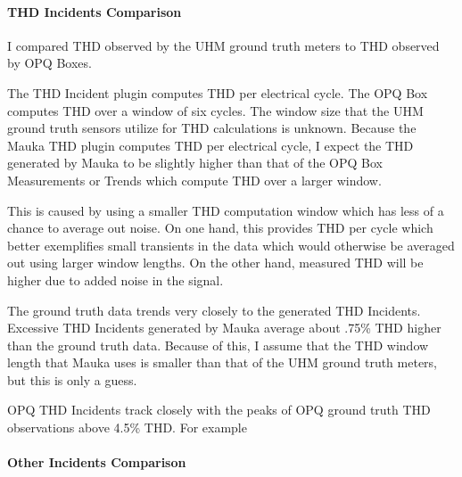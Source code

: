 \paragraph{THD Incidents Comparison}

I compared THD observed by the UHM ground truth meters to THD observed by OPQ Boxes.

The THD Incident plugin computes THD per electrical cycle. The OPQ Box computes THD over a window of six cycles. The window size that the UHM ground truth sensors utilize for THD calculations is unknown. Because the Mauka THD plugin computes THD per electrical cycle, I expect the THD generated by Mauka to be slightly higher than that of the OPQ Box Measurements or Trends which compute THD over a larger window.

This is caused by using a smaller THD computation window which has less of a chance to average out noise. On one hand, this provides THD per cycle which better exemplifies small transients in the data which would otherwise be averaged out using larger window lengths. On the other hand, measured THD will be higher due to added noise in the signal.

The ground truth data trends very closely to the generated THD Incidents. Excessive THD Incidents generated by Mauka average about .75\% THD higher than the ground truth data. Because of this, I assume that the THD window length that Mauka uses is smaller than that of the UHM ground truth meters, but this is only a guess.

OPQ THD Incidents track closely with the peaks of OPQ ground truth THD observations above 4.5\% THD. For example

\paragraph{Other Incidents Comparison}
